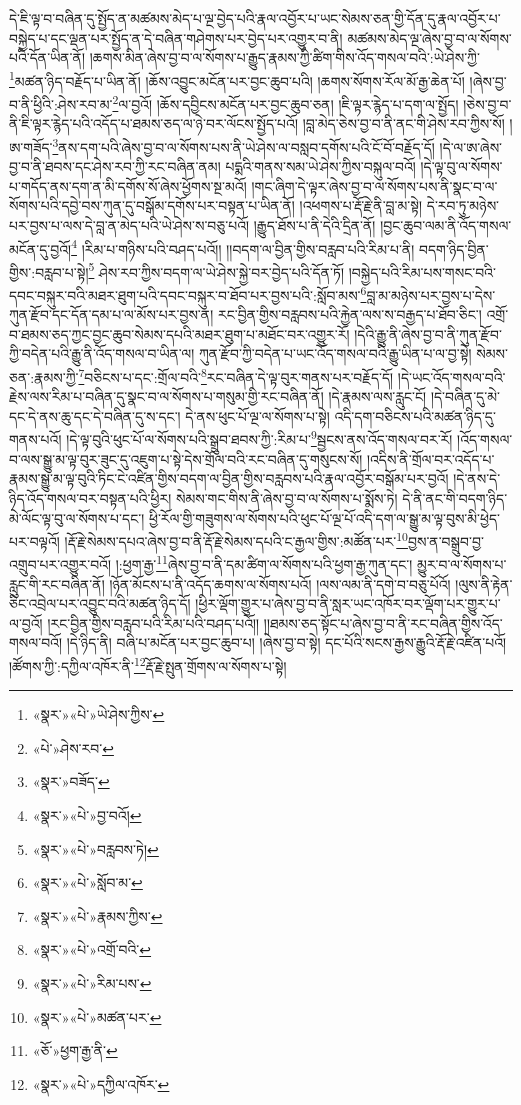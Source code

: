དེ་ཇི་ལྟ་བ་བཞིན་དུ་སྤྱོད་ན་མཚམས་མེད་པ་ལྔ་བྱེད་པའི་རྣལ་འབྱོར་པ་ཡང་སེམས་ཅན་གྱི་དོན་དུ་རྣལ་འབྱོར་པ་བསྐྱེད་པ་དང་ལྡན་པར་སྤྱོད་ན་དེ་བཞིན་གཤེགས་པར་བྱེད་པར་འགྱུར་བ་ནི། མཚམས་མེད་ལྔ་ཞེས་བྱ་བ་ལ་སོགས་པའི་དོན་ཡིན་ནོ། །ཆགས་མིན་ཞེས་བྱ་བ་ལ་སོགས་པ་རྒྱུད་རྣམས་ཀྱི་ཚིག་གིས་འོད་གསལ་བའི་:ཡེ་ཤེས་ཀྱི་\footnote{«སྣར་»«པེ་»ཡེ་ཤེས་ཀྱིས་}མཚན་ཉིད་བརྗོད་པ་ཡིན་ནོ། །ཆོས་འབྱུང་མངོན་པར་བྱང་ཆུབ་པའི། །ཆགས་སོགས་རོལ་མོ་རྒྱ་ཆེན་པོ། །ཞེས་བྱ་བ་ནི་ཕྱིའི་:ཤེས་རབ་མ་\footnote{«པེ་»ཤེས་རབ་}ལ་བྱའོ། །ཆོས་དབྱིངས་མངོན་པར་བྱང་ཆུབ་ཅན། །ཇི་ལྟར་རྙེད་པ་དག་ལ་སྤྱོད། །ཅེས་བྱ་བ་ནི་ཇི་ལྟར་རྙེད་པའི་འདོད་པ་ཐམས་ཅད་ལ་ཉེ་བར་ལོངས་སྤྱོད་པའོ། །བླ་མེད་ཅེས་བྱ་བ་ནི་ནང་གི་ཤེས་རབ་ཀྱིས་སོ། །ཨ་གཟོད་\footnote{«སྣར་»བཟོད་}ནས་དག་པའི་ཞེས་བྱ་བ་ལ་སོགས་པས་ནི་ཡེ་ཤེས་ལ་བསླབ་དགོས་པའི་ངོ་བོ་བརྗོད་དོ། །དེ་ལ་ཨ་ཞེས་བྱ་བ་ནི་ཐབས་དང་ཤེས་རབ་ཀྱི་རང་བཞིན་ནམ། པདྨའི་གནས་སམ་ཡེ་ཤེས་ཀྱིས་བསྐུལ་བའོ། །དེ་ལྟ་བུ་ལ་སོགས་པ་གདོད་ནས་དག་ན་མི་དགོས་སོ་ཞེས་ཕྱོགས་སྔ་མའོ། །གང་ཞིག་དེ་ལྟར་ཞེས་བྱ་བ་ལ་སོགས་པས་ནི་སྣང་བ་ལ་སོགས་པའི་དབྱེ་བས་ཀུན་དུ་བསྒོམ་དགོས་པར་བསྟན་པ་ཡིན་ནོ། །འཕགས་པ་རྡོ་རྗེ་ནི་བླ་མ་སྟེ། དེ་རབ་ཏུ་མཉེས་པར་བྱས་པ་ལས་དེ་བླ་ན་མེད་པའི་ཡེ་ཤེས་ས་བཅུ་པའོ། །རྒྱུད་ཐོས་པ་ནི་དེའི་དྲིན་ནོ། །བྱང་ཆུབ་ལམ་ནི་འོད་གསལ་མངོན་དུ་བྱའོ།\footnote{«སྣར་»«པེ་»བྱ་བའོ།} །རིམ་པ་གཉིས་པའི་བཤད་པའོ།། །།བདག་ལ་བྱིན་གྱིས་བརླབ་པའི་རིམ་པ་ནི། བདག་ཉིད་བྱིན་གྱིས་:བརླབ་པ་སྟེ།\footnote{«སྣར་»«པེ་»བརླབས་ཏེ།} ཤེས་རབ་ཀྱིས་བདག་ལ་ཡེ་ཤེས་སྐྱེ་བར་བྱེད་པའི་དོན་ཏོ། །བསྐྱེད་པའི་རིམ་པས་གསང་བའི་དབང་བསྐུར་བའི་མཐར་ཐུག་པའི་དབང་བསྐུར་བ་ཐོབ་པར་བྱས་པའི་:སློབ་མས་\footnote{«སྣར་»«པེ་»སློབ་མ་}བླ་མ་མཉེས་པར་བྱས་པ་དེས་ཀུན་རྫོབ་དང་དོན་དམ་པ་ལ་མོས་པར་བྱས་ན། རང་བྱིན་གྱིས་བརླབས་པའི་རྐྱེན་ལས་ས་བརྒྱད་པ་ཐོབ་ཅིང་། འགྲོ་བ་ཐམས་ཅད་ཀྱང་བྱང་ཆུབ་སེམས་དཔའི་མཐར་ཐུག་པ་མཐོང་བར་འགྱུར་རོ། །དེའི་རྒྱུ་ནི་ཞེས་བྱ་བ་ནི་ཀུན་རྫོབ་ཀྱི་བདེན་པའི་རྒྱུ་ནི་འོད་གསལ་བ་ཡིན་ལ། ཀུན་རྫོབ་ཀྱི་བདེན་པ་ཡང་འོད་གསལ་བའི་རྒྱུ་ཡིན་པ་ལ་བྱ་སྟེ། སེམས་ཅན་:རྣམས་ཀྱི་\footnote{«སྣར་»«པེ་»རྣམས་ཀྱིས་}བཅིངས་པ་དང་:གྲོལ་བའི་\footnote{«སྣར་»«པེ་»འགྲོ་བའི་}རང་བཞིན་དེ་ལྟ་བུར་གནས་པར་བརྗོད་དོ། །དེ་ཡང་འོད་གསལ་བའི་རྗེས་ལས་རིམ་པ་བཞིན་དུ་སྣང་བ་ལ་སོགས་པ་གསུམ་གྱི་རང་བཞིན་ནོ། །དེ་རྣམས་ལས་རླུང་ངོ། །དེ་བཞིན་དུ་མེ་དང་དེ་ནས་ཆུ་དང་དེ་བཞིན་དུ་ས་དང་། དེ་ནས་ཕུང་པོ་ལྔ་ལ་སོགས་པ་སྟེ། འདི་དག་བཅིངས་པའི་མཚན་ཉིད་དུ་གནས་པའོ། །དེ་ལྟ་བུའི་ཕུང་པོ་ལ་སོགས་པའི་སྒྲུབ་ཐབས་ཀྱི་:རིམ་པ་\footnote{«སྣར་»«པེ་»རིམ་པས་}སྦྱངས་ནས་འོད་གསལ་བར་རོ། །འོད་གསལ་བ་ལས་སྒྱུ་མ་ལྟ་བུར་ཟུང་དུ་འཇུག་པ་སྟེ་དེས་གྲོལ་བའི་རང་བཞིན་དུ་གསུངས་སོ། །འདིས་ནི་གྲོལ་བར་འདོད་པ་རྣམས་སྒྱུ་མ་ལྟ་བུའི་ཏིང་ངེ་འཛིན་གྱིས་བདག་ལ་བྱིན་གྱིས་བརླབས་པའི་རྣལ་འབྱོར་བསྒོམ་པར་བྱའོ། །དེ་ནས་དེ་ཉིད་འོད་གསལ་བར་བསྟན་པའི་ཕྱིར། སེམས་གང་གིས་ནི་ཞེས་བྱ་བ་ལ་སོགས་པ་སྨོས་ཏེ། དེ་ནི་ནང་གི་བདག་ཉིད་མེ་ལོང་ལྟ་བུ་ལ་སོགས་པ་དང་། ཕྱི་རོལ་གྱི་གཟུགས་ལ་སོགས་པའི་ཕུང་པོ་ལྔ་པོ་འདི་དག་ལ་སྒྱུ་མ་ལྟ་བུས་མི་ཕྱེད་པར་བལྟའོ། །རྡོ་རྗེ་སེམས་དཔའ་ཞེས་བྱ་བ་ནི་རྡོ་རྗེ་སེམས་དཔའི་ང་རྒྱལ་གྱིས་:མཚོན་པར་\footnote{«སྣར་»«པེ་»མཚན་པར་}བྱས་ན་བསྒྲུབ་བྱ་འགྲུབ་པར་འགྱུར་བའོ། །:ཕྱག་རྒྱ་\footnote{«ཅོ་»ཕྱག་རྒྱ་ནི་}ཞེས་བྱ་བ་ནི་དམ་ཚིག་ལ་སོགས་པའི་ཕྱག་རྒྱ་ཀུན་དང་། མྱུར་བ་ལ་སོགས་པ་རླུང་གི་རང་བཞིན་ནོ། །ཉོན་མོངས་པ་ནི་འདོད་ཆགས་ལ་སོགས་པའོ། །ལས་ལམ་ནི་དགེ་བ་བཅུ་པོའོ། །ལུས་ནི་རྟེན་ཅིང་འབྲེལ་པར་འབྱུང་བའི་མཚན་ཉིད་དོ། །ཕྱིར་ལྡོག་གྱུར་པ་ཞེས་བྱ་བ་ནི་སླར་ཡང་འཁོར་བར་ལྡོག་པར་གྱུར་པ་ལ་བྱའོ། །རང་བྱིན་གྱིས་བརླབ་པའི་རིམ་པའི་བཤད་པའོ།། །།ཐམས་ཅད་སྟོང་པ་ཞེས་བྱ་བ་ནི་རང་བཞིན་གྱིས་འོད་གསལ་བའོ། །དེ་ཉིད་ནི། བཞི་པ་མངོན་པར་བྱང་ཆུབ་པ། །ཞེས་བྱ་བ་སྟེ། དང་པོའི་སངས་རྒྱས་རྒྱུའི་རྡོ་རྗེ་འཛིན་པའོ། །ཚོགས་ཀྱི་:དཀྱིལ་འཁོར་ནི་\footnote{«སྣར་»«པེ་»དཀྱིལ་འཁོར་}རྡོ་རྗེ་སྤུན་གྲོགས་ལ་སོགས་པ་སྟེ། 